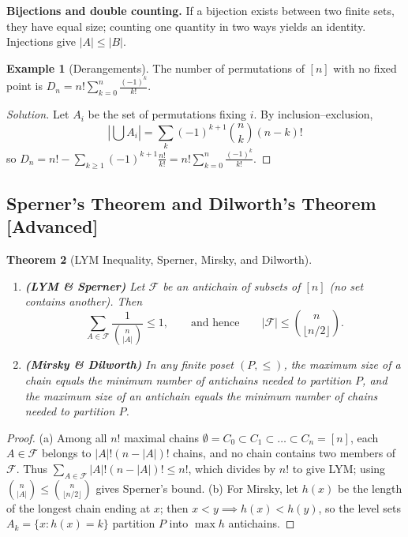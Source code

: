 \documentclass[11pt]{article}
\theoremstyle{plain}
\newtheorem{theorem}{Theorem}[section]
\theoremstyle{definition}
\newtheorem{example}[theorem]{Example}
\newenvironment{solution}{\begin{proof}[Solution]}{\end{proof}}
\begin{document}
\textbf{Bijections and double counting.} If a bijection exists between two
finite sets, they have equal size; counting one quantity in two ways yields an
identity. Injections give $|A|\le|B|$.

\begin{example}[Derangements]
The number of permutations of $[n]$ with no fixed point is
$D_n = n!\sum_{k=0}^{n}\frac{(-1)^k}{k!}$.
\end{example}
\begin{solution}
Let $A_i$ be the set of permutations fixing $i$. By inclusion--exclusion,
$$|\bigcup A_i| = \sum_k (-1)^{k+1}\binom nk (n-k)!$$so
$D_n = n! - \sum_{k\ge1}(-1)^{k+1}\frac{n!}{k!} = n!\sum_{k=0}^n \frac{(-1)^k}{k!}$.
\end{solution}

\subsection{Sperner's Theorem and Dilworth's Theorem [Advanced]}

\begin{theorem}[LYM Inequality, Sperner, Mirsky, and Dilworth]
\leavevmode
\begin{enumerate}[label=(\alph*)]
\item \textbf{(LYM \& Sperner)} Let $\mathcal{F}$ be an antichain of subsets of $[n]$ (no set contains another). Then
\[
\sum_{A \in \mathcal{F}} \frac{1}{\binom{n}{|A|}} \le 1, \qquad\text{and hence}\qquad
|\mathcal{F}| \le \binom{n}{\lfloor n/2 \rfloor}.
\]
\item \textbf{(Mirsky \& Dilworth)} In any finite poset $(P, \le)$, the maximum size of a chain equals the minimum number of antichains needed to partition $P$, and the maximum size of an antichain equals the minimum number of chains needed to partition $P$.
\end{enumerate}
\end{theorem}
\begin{proof}
(a) Among all $n!$ maximal chains $\emptyset = C_0 \subset C_1 \subset \dots \subset C_n = [n]$, each $A \in \mathcal{F}$ belongs to $|A|!(n-|A|)!$ chains, and no chain contains two members of $\mathcal{F}$. Thus $\sum_{A \in \mathcal{F}} |A|!(n-|A|)! \le n!$, which divides by $n!$ to give LYM; using $\binom{n}{|A|} \le \binom{n}{\lfloor n/2\rfloor}$ gives Sperner's bound.
(b) For Mirsky, let $h(x)$ be the length of the longest chain ending at $x$; then $x < y \implies h(x) < h(y)$, so the level sets $A_k = \{x : h(x)=k\}$ partition $P$ into $\max h$ antichains.
\end{proof}
\end{document}
